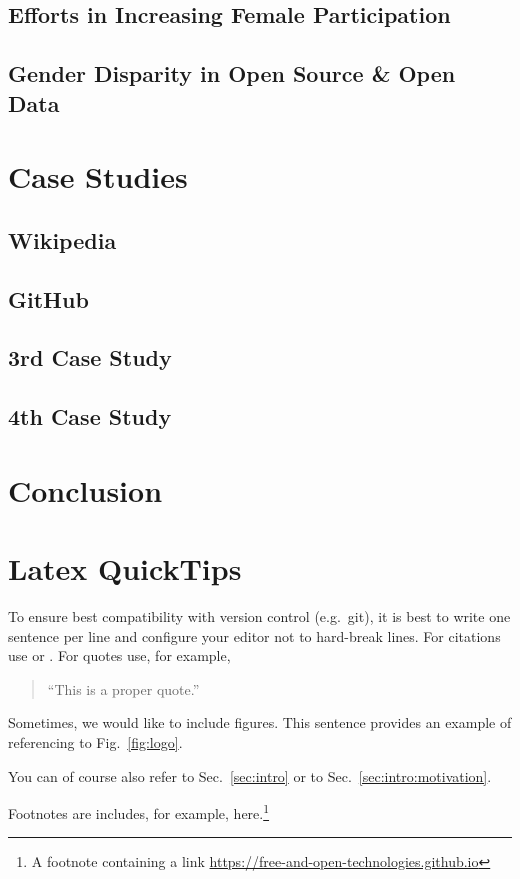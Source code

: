 \documentclass[a4paper, 11pt]{article}
\begin{document}
\subsection{Efforts in Increasing Female Participation} \label{sec:gender-disparity:efforts}

\subsection{Gender Disparity in Open Source \& Open Data}

\section{Case Studies} \label{sec:casestudies}

\subsection{Wikipedia} \label{sec:casestudies:wikipedia}

\subsection{GitHub} \label{sec:casestudies:github}

\subsection{3rd Case Study}

\subsection{4th Case Study}

\section{Conclusion} \label{sec:conclusion}




\doclicenseThis

\section{Latex QuickTips} \label{sec:tips}

To ensure best compatibility with version control (e.g.\ git), it is best to write one sentence per line and configure your editor not to hard-break lines.
For citations use \cite{terrell-gender-bias} or \cite[p.\ 6--8]{terrell-gender-bias}.
For quotes use, for example,
\begin{quote}
	``This is a proper quote.'' 
\end{quote}

Sometimes, we would like to include figures.
This sentence provides an example of referencing to Fig.~\ref{fig:logo}.

You can of course also refer to Sec.~\ref{sec:intro} or to Sec.~\ref{sec:intro:motivation}.

Footnotes are includes, for example, here.\footnote{A footnote containing a link \url{https://free-and-open-technologies.github.io}}
\end{document}

